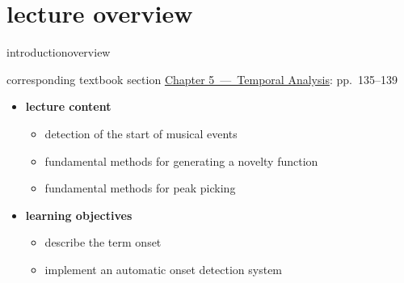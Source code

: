 




\subtitle{Module 6.1: Onset Detection}


	

    \section[overview]{lecture overview}
        \begin{frame}{introduction}{overview}
            \begin{block}{corresponding textbook section}
                    \href{http://ieeexplore.ieee.org/xpl/articleDetails.jsp?arnumber=6331123}{Chapter 5~---~Temporal Analysis}: pp.~135--139
            \end{block}

            \begin{itemize}
                \item   \textbf{lecture content}
                    \begin{itemize}
                        \item   detection of the start of musical events
                        \item   fundamental methods for generating a novelty function
                        \item   fundamental methods for peak picking
                    \end{itemize}
                \bigskip
                \item<2->   \textbf{learning objectives}
                    \begin{itemize}
                        \item   describe the term onset
                        \item   implement an automatic onset detection system
                    \end{itemize}
            \end{itemize}
        \end{frame}

